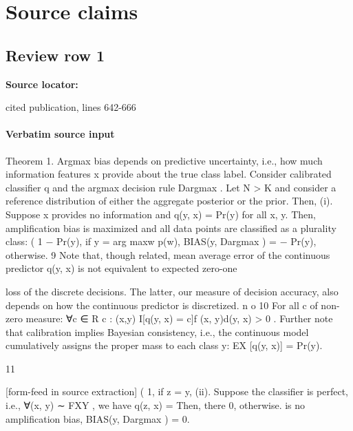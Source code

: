 \documentclass[10pt]{article}
\begin{document}
\clearpage
\hypertarget{source-claim-1966e78967344232}{}
\hypertarget{source-section-f10b5f68e4acf3dc}{}
\section*{Source claims}
\subsection*{Review row 1}
\textbf{Source locator:} {\footnotesize\raggedright cited publication, lines 642-\allowbreak{}666\par}
\paragraph{Verbatim source input}
\begin{ReviewVerbatim}
Theorem 1. Argmax bias depends on predictive uncertainty, i.e., how much information features x provide
about the true class label. Consider calibrated classifier q and the argmax decision rule Dargmax . Let N > K
and consider a reference distribution of either the aggregate posterior or the prior. Then,
  (i). Suppose x provides no information and q(y, x) = Pr(y) for all x, y. Then, amplification bias is
       maximized and all data points are classified as a plurality class:
                                                  (
                                                    1 − Pr(y), if y = arg maxw p(w),
                            BIAS(y, Dargmax ) =
                                                    − Pr(y),      otherwise.
   9 Note that, though related, mean average error of the continuous predictor q(y, x) is not equivalent to expected zero-one

loss of the discrete decisions. The latter, our measure of decision accuracy, also depends on how the continuous predictor is
discretized.                                n                                           o
  10 For all c of non-zero measure: ∀c ∈
                                                 R
                                             c : (x,y) I[q(y, x) = c]f (x, y)d(y, x) > 0 . Further note that calibration implies
Bayesian consistency, i.e., the continuous model cumulatively assigns the proper mass to each class y: EX [q(y, x)] = Pr(y).


                                                              11

[form-feed in source extraction]
                                                                                   (
                                                                                    1,                                                                        if z = y,
  (ii). Suppose the classifier is perfect, i.e., ∀(x, y) ∼ FXY , we have q(z, x) =                                                                                       Then, there
                                                                                    0,                                                                        otherwise.
        is no amplification bias, BIAS(y, Dargmax ) = 0.
\end{ReviewVerbatim}
\end{document}
